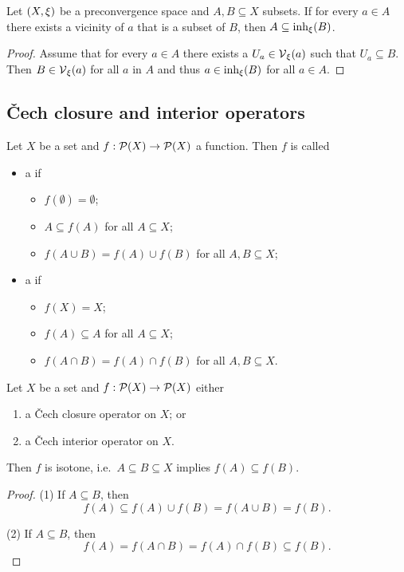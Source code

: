 \begin{lemma} \label{subsetWithVicinitiesInInherence}
Let $\sSet{X,\xi}$ be a preconvergence space and $A,B\subseteq X$ subsets. If for every $a\in A$ there exists a vicinity of $a$ that is a subset of $B$, then $A\subseteq \operatorname{inh}_\xi(B)$.
\end{lemma}
\begin{proof}
Assume that for every $a\in A$ there exists a $U_a \in \operatorname{\mathcal{V}}_\xi(a)$ such that $U_a \subseteq B$. Then $B\in \operatorname{\mathcal{V}}_\xi(a)$ for all $a$ in $A$ and thus $a\in \operatorname{inh}_\xi(B)$ for all $a\in A$.
\end{proof}

\subsection{Čech closure and interior operators}
\begin{definition}
Let $X$ be a set and $f: \operatorname{\mathcal{P}}(X)\to \operatorname{\mathcal{P}}(X)$ a function. Then $f$ is called
\begin{itemize}
\item a  if
\begin{itemize}
\item $f(\emptyset) = \emptyset$;
\item $A\subseteq f(A)$ for all $A\subseteq X$;
\item $f(A \cup B) = f(A)\cup f(B)$ for all $A,B\subseteq X$;
\end{itemize}
\item a  if
\begin{itemize}
\item $f(X) = X$;
\item $f(A)\subseteq A$ for all $A\subseteq X$;
\item $f(A \cap B) = f(A)\cap f(B)$ for all $A,B\subseteq X$.
\end{itemize}
\end{itemize}
\end{definition}

\begin{lemma}
Let $X$ be a set and $f: \operatorname{\mathcal{P}}(X)\to \operatorname{\mathcal{P}}(X)$ either
\begin{enumerate}
\item a Čech closure operator on $X$; or
\item a Čech interior operator on $X$.
\end{enumerate}
Then $f$ is isotone, i.e.\ $A\subseteq B\subseteq X$ implies $f(A) \subseteq f(B)$.
\end{lemma}
\begin{proof}
(1) If $A\subseteq B$, then 
\[ f(A) \subseteq f(A)\cup f(B) = f(A\cup B) = f(B). \]

(2) If $A\subseteq B$, then 
\[ f(A) = f(A\cap B) = f(A)\cap f(B) \subseteq f(B). \]
\end{proof}

